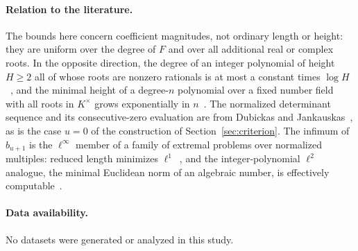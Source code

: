 \documentclass[11pt]{article}
\theoremstyle{definition}
\theoremstyle{plain}
\begin{document}
\paragraph{Relation to the literature.}  The bounds here concern coefficient
magnitudes, not ordinary length or height: they are uniform over the degree
of $F$ and over all additional real or complex roots.  In the opposite
direction, the degree of an integer polynomial of height $H\ge2$ all of whose
roots are nonzero rationals is at most a constant times $\log H$~\cite{htv},
and the minimal height of a degree-$n$ polynomial over a fixed number field
with all roots in $K^\times$ grows exponentially in $n$~\cite{tromp}.  The
normalized determinant sequence and its consecutive-zero evaluation are from
Dubickas and Jankauskas~\cite{dj}, as is the case $u=0$ of the construction
of Section~\ref{sec:criterion}.  The infimum of $b_{u+1}$ is the
$\ell^\infty$ member of a family of extremal problems over normalized
multiples: reduced length minimizes $\ell^1$~\cite{schinzel}, and the
integer-polynomial $\ell^2$ analogue, the minimal Euclidean norm of an
algebraic number, is effectively computable~\cite{frw}.

\paragraph{Data availability.}
No datasets were generated or analyzed in this study.
\end{document}
